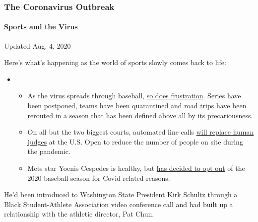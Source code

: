 \hypertarget{the-coronavirus-outbreak}{%
\subsubsection{The Coronavirus
Outbreak}\label{the-coronavirus-outbreak}}

\hypertarget{sports-and-the-virus}{%
\paragraph{Sports and the Virus}\label{sports-and-the-virus}}

Updated Aug. 4, 2020

Here's what's happening as the world of sports slowly comes back to
life:

\begin{itemize}
\item
  \begin{itemize}
  \tightlist
  \item
    As the virus spreads through baseball,
    \href{https://www.nytimes3xbfgragh.onion/2020/08/03/sports/baseball/mlb-coronavirus-outbreak.html?action=click\&pgtype=Article\&state=default\&region=MAIN_CONTENT_2\&context=storylines_keepup}{so
    does frustration}. Series have been postponed, teams have been
    quarantined and road trips have been rerouted in a season that has
    been defined above all by its precariousness.
  \item
    On all but the two biggest courts, automated line calls
    \href{https://www.nytimes3xbfgragh.onion/2020/08/03/sports/tennis/us-open-hawkeye-line-judges.html?action=click\&pgtype=Article\&state=default\&region=MAIN_CONTENT_2\&context=storylines_keepup}{will
    replace human judges} at the U.S. Open to reduce the number of
    people on site during the pandemic.
  \item
    Mets star Yoenis Cespedes is healthy, but
    \href{https://www.nytimes3xbfgragh.onion/2020/08/02/sports/baseball/Yoenis-cespedes-opt-out-rule.html?action=click\&pgtype=Article\&state=default\&region=MAIN_CONTENT_2\&context=storylines_keepup}{has
    decided to opt out} of the 2020 baseball season for Covid-related
    reasons.
  \end{itemize}
\end{itemize}

He'd been introduced to Washington State President Kirk Schultz through
a Black Student-Athlete Association video conference call and had built
up a relationship with the athletic director, Pat Chun.

